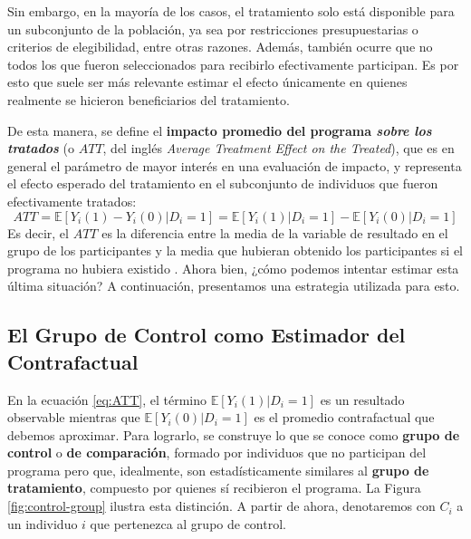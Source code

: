 \documentclass[../../main.tex]{subfiles}
\begin{document}
Sin embargo, en la mayoría de los casos, el tratamiento solo está disponible para un
subconjunto de la población, ya sea por restricciones presupuestarias o criterios de
elegibilidad, entre otras razones. Además, también ocurre que no todos los que fueron
seleccionados para recibirlo efectivamente participan. Es por esto que suele ser más
relevante estimar el efecto únicamente en quienes realmente se hicieron beneficiarios del
tratamiento.

De esta manera, se define el \textbf{impacto promedio del programa \textit{sobre los
tratados}} (o \(ATT\), del inglés \textit{Average Treatment Effect on the Treated}), que
es en general el parámetro de mayor interés en una evaluación de impacto, y representa el
efecto esperado del tratamiento en el subconjunto de individuos que fueron efectivamente
tratados:
\begin{equation}
    ATT = \mathbb{E} \left[Y_i(1)-Y_i(0)|D_i=1\right] = \mathbb{E} \left[Y_i(1)|D_i=1\right] -
    \mathbb{E} \left[Y_i(0)|D_i=1\right]
    \label{eq:ATT}
\end{equation}
Es decir, el \(ATT\) es la diferencia entre la media de la variable de resultado en el
grupo de los participantes y la media que hubieran obtenido los participantes si el
programa no hubiera existido \cite{bernal}. Ahora bien, ¿cómo podemos intentar estimar
esta última situación? A continuación, presentamos una estrategia utilizada para esto.

\subsection{El Grupo de Control como Estimador del Contrafactual}
En la ecuación \ref{eq:ATT}, el término \(\mathbb{E} \left[Y_i(1)|D_i=1\right]\) es un
resultado observable mientras que \(\mathbb{E} \left[Y_i(0)|D_i=1\right]\) es el promedio
contrafactual que debemos aproximar. Para lograrlo, se construye lo que se conoce como
\textbf{grupo de control} o \textbf{de comparación}, formado por individuos que no
participan del programa pero que, idealmente, son estadísticamente similares
\cite{gertler-2016} al \textbf{grupo de tratamiento}, compuesto por quienes sí recibieron
el programa. La Figura \ref{fig:control-group} ilustra esta distinción. A partir de ahora,
denotaremos con \(C_i\) a un individuo \(i\) que pertenezca al grupo de control.
\end{document}
